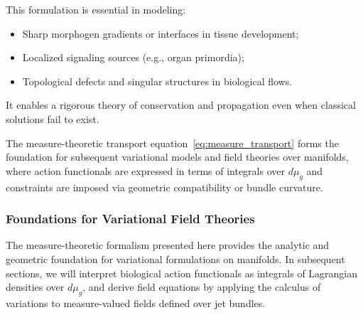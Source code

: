 This formulation is essential in modeling:
\begin{itemize}
  \item Sharp morphogen gradients or interfaces in tissue development;
  \item Localized signaling sources (e.g., organ primordia);
  \item Topological defects and singular structures in biological flows.
\end{itemize}
It enables a rigorous theory of conservation and propagation even when classical solutions fail to exist.

The measure-theoretic transport equation~\eqref{eq:measure_transport} forms the foundation for subsequent variational models and field theories over manifolds, where action functionals are expressed in terms of integrals over $d\mu_g$ and constraints are imposed via geometric compatibility or bundle curvature.


\subsubsection*{Foundations for Variational Field Theories}

The measure-theoretic formalism presented here provides the analytic and geometric foundation for variational formulations on manifolds. In subsequent sections, we will interpret biological action functionals as integrals of Lagrangian densities over $d\mu_g$, and derive field equations by applying the calculus of variations to measure-valued fields defined over jet bundles.


